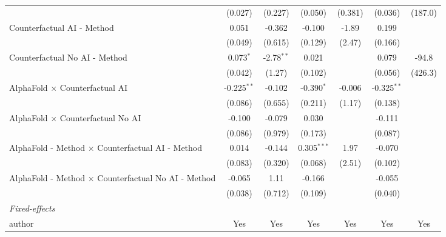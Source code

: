 \begin{tabular}{lcccccc}
                                                              & (0.027)       & (0.227)      & (0.050)       & (0.381)      & (0.036)       & (187.0)\\   
   Counterfactual AI - Method                                 & 0.051         & -0.362       & -0.100        & -1.89        & 0.199         &   \\   
                                                              & (0.049)       & (0.615)      & (0.129)       & (2.47)       & (0.166)       &   \\   
   Counterfactual No AI - Method                              & 0.073$^{*}$   & -2.78$^{**}$ & 0.021         &              & 0.079         & -94.8\\   
                                                              & (0.042)       & (1.27)       & (0.102)       &              & (0.056)       & (426.3)\\   
   AlphaFold $\times$ Counterfactual AI                       & -0.225$^{**}$ & -0.102       & -0.390$^{*}$  & -0.006       & -0.325$^{**}$ &   \\   
                                                              & (0.086)       & (0.655)      & (0.211)       & (1.17)       & (0.138)       &   \\   
   AlphaFold $\times$ Counterfactual No AI                    & -0.100        & -0.079       & 0.030         &              & -0.111        &   \\   
                                                              & (0.086)       & (0.979)      & (0.173)       &              & (0.087)       &   \\   
   AlphaFold - Method $\times$ Counterfactual AI - Method     & 0.014         & -0.144       & 0.305$^{***}$ & 1.97         & -0.070        &   \\   
                                                              & (0.083)       & (0.320)      & (0.068)       & (2.51)       & (0.102)       &   \\   
   AlphaFold - Method $\times$ Counterfactual No AI - Method  & -0.065        & 1.11         & -0.166        &              & -0.055        &   \\   
                                                              & (0.038)       & (0.712)      & (0.109)       &              & (0.040)       &   \\   
   \midrule
   \emph{Fixed-effects}\\
   author                                                     & Yes           & Yes          & Yes           & Yes          & Yes           & Yes\\  

\end{tabular}
